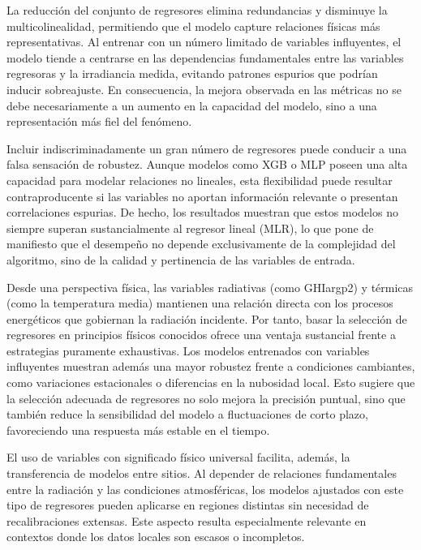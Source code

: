 \documentclass[letterpaper,12pt, twoside]{report}
\providecommand{\DIFdeltex}[1]{{\protect\color{red} \scriptsize #1}} %
\providecommand{\DIFdel}[1]{\texorpdfstring{\DIFdeltex{#1}}{}} %
\begin{document}
\DIFdel{La reducción del conjunto de regresores elimina redundancias y disminuye la multicolinealidad, permitiendo que el modelo capture relaciones físicas más representativas. Al entrenar con un número limitado de variables influyentes, el modelo tiende a centrarse en las dependencias fundamentales entre las variables regresoras y la irradiancia medida, evitando patrones espurios que podrían inducir sobreajuste. En consecuencia, la mejora observada en las métricas no se debe necesariamente a un aumento en la capacidad del modelo, sino a una representación más fiel del fenómeno.
}%

\DIFdel{Incluir indiscriminadamente un gran número de regresores puede conducir a una falsa sensación de robustez. Aunque modelos como XGB o MLP poseen una alta capacidad para modelar relaciones no lineales, esta flexibilidad puede resultar contraproducente si las variables no aportan información relevante o presentan correlaciones espurias. De hecho, los resultados muestran que estos modelos no siempre superan sustancialmente al regresor lineal (MLR), lo que pone de manifiesto que el desempeño no depende exclusivamente de la complejidad del algoritmo, sino de la calidad y pertinencia de las variables de entrada.
}%

\DIFdel{Desde una perspectiva física, las variables radiativas (como GHIargp2) y térmicas (como la temperatura media) mantienen una relación directa con los procesos energéticos que gobiernan la radiación incidente. Por tanto, basar la selección de regresores en principios físicos conocidos ofrece una ventaja sustancial frente a estrategias puramente exhaustivas. Los modelos entrenados con variables influyentes muestran además una mayor robustez frente a condiciones cambiantes, como variaciones estacionales o diferencias en la nubosidad local. Esto sugiere que la selección adecuada de regresores no solo mejora la precisión puntual, sino que también reduce la sensibilidad del modelo a fluctuaciones de corto plazo, favoreciendo una respuesta más estable en el tiempo.
}%

\DIFdel{El uso de variables con significado físico universal facilita, además, la transferencia de modelos entre sitios. Al depender de relaciones fundamentales entre la radiación y las condiciones atmosféricas, los modelos ajustados con este tipo de regresores pueden aplicarse en regiones distintas sin necesidad de recalibraciones extensas. Este aspecto resulta especialmente relevante en contextos donde los datos locales son escasos o incompletos.
}%
\end{document}
